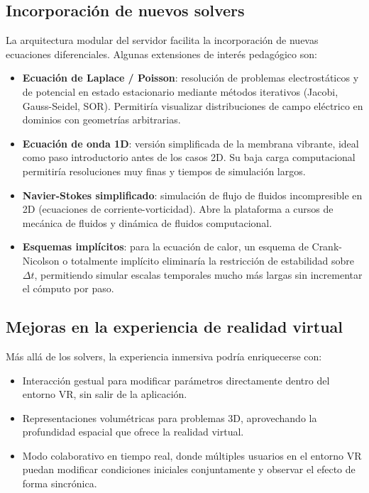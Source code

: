 \documentclass[12pt, a4paper]{article}
\begin{document}
\subsection{Incorporación de nuevos solvers}

La arquitectura modular del servidor facilita la incorporación de nuevas ecuaciones
diferenciales. Algunas extensiones de interés pedagógico son:

\begin{itemize}
    \item \textbf{Ecuación de Laplace / Poisson}: resolución de problemas electrostáticos
    y de potencial en estado estacionario mediante métodos iterativos (Jacobi,
    Gauss-Seidel, SOR). Permitiría visualizar distribuciones de campo eléctrico en
    dominios con geometrías arbitrarias.

    \item \textbf{Ecuación de onda 1D}: versión simplificada de la membrana vibrante,
    ideal como paso introductorio antes de los casos 2D. Su baja carga computacional
    permitiría resoluciones muy finas y tiempos de simulación largos.

    \item \textbf{Navier-Stokes simplificado}: simulación de flujo de fluidos
    incompresible en 2D (ecuaciones de corriente-vorticidad). Abre la plataforma a
    cursos de mecánica de fluidos y dinámica de fluidos computacional.

    \item \textbf{Esquemas implícitos}: para la ecuación de calor, un esquema de
    Crank-Nicolson o totalmente implícito eliminaría la restricción de estabilidad
    sobre $\Delta t$, permitiendo simular escalas temporales mucho más largas sin
    incrementar el cómputo por paso.
\end{itemize}

\subsection{Mejoras en la experiencia de realidad virtual}

Más allá de los solvers, la experiencia inmersiva podría enriquecerse con:

\begin{itemize}
    \item Interacción gestual para modificar parámetros directamente dentro del entorno
    VR, sin salir de la aplicación.
    \item Representaciones volumétricas para problemas 3D, aprovechando la profundidad
    espacial que ofrece la realidad virtual.
    \item Modo colaborativo en tiempo real, donde múltiples usuarios en el entorno VR
    puedan modificar condiciones iniciales conjuntamente y observar el efecto de forma
    sincrónica.
\end{itemize}

\vfill
\end{document}

